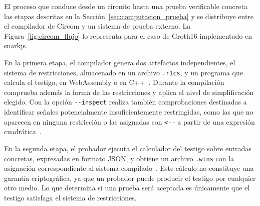 El proceso que conduce desde un circuito hasta una prueba verificable concreta las etapas
descritas en la Sección~\ref{sec:computacion_prueba} y se distribuye entre el compilador de
Circom y un sistema de prueba externo. La Figura~\ref{fig:circom_flujo} lo representa para el
caso de Groth16 implementado en snarkjs.

En la primera etapa, el compilador genera dos artefactos independientes, el sistema de
restricciones, almacenado en un archivo \texttt{.r1cs}, y un programa que calcula el testigo, en
WebAssembly o en C++~\cite{circomdocs}. Durante la compilación comprueba además la forma de las
restricciones y aplica el nivel de simplificación elegido. Con la opción \lstinline|--inspect|
realiza también comprobaciones destinadas a identificar señales potencialmente
insuficientemente restringidas, como las que no aparecen en ninguna restricción o las asignadas
con \lstinline|<--| a partir de una expresión cuadrática~\cite{circomdocs, circomreleases}.

En la segunda etapa, el probador ejecuta el calculador del testigo sobre entradas concretas,
expresadas en formato JSON, y obtiene un archivo \texttt{.wtns} con la asignación correspondiente
al sistema compilado~\cite{circomdocs}. Este cálculo no constituye una garantía criptográfica, ya
que un probador puede producir el testigo por cualquier otro medio. Lo que determina si una
prueba será aceptada es únicamente que el testigo satisfaga el sistema de restricciones.

